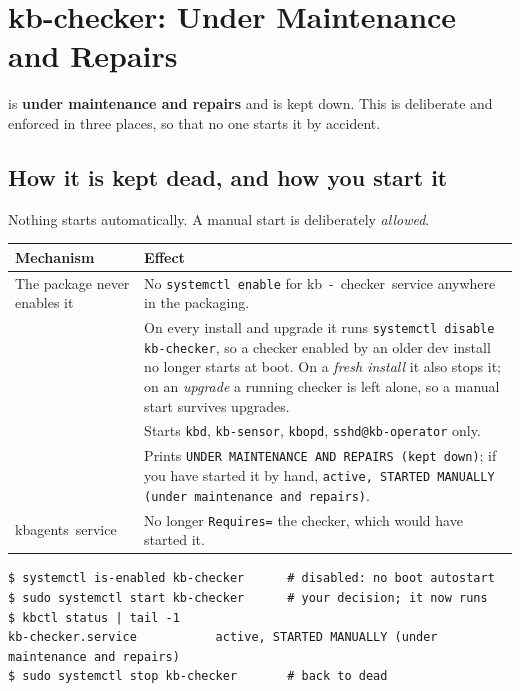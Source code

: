 \chapter{kb-checker: Under Maintenance and Repairs}
\label{ch:checker}
\begin{kbwarn}
 is \textbf{under maintenance and repairs} and is kept down. This is deliberate and
enforced in three places, so that no one starts it by accident.
\end{kbwarn}

\section{How it is kept dead, and how you start it}
Nothing starts  automatically. A manual start is deliberately \emph{allowed}.
\begin{center}\small
\begin{tabularx}{\textwidth}{@{}L{4.6cm}Y@{}}
\toprule
\textbf{Mechanism} & \textbf{Effect}\\
\midrule
The package never enables it & No \texttt{systemctl enable} for \unit{kb-checker.service} anywhere in the packaging.\\
 & On every install and upgrade it runs \texttt{systemctl disable kb-checker}, so a checker enabled by an older dev install no longer starts at boot. On a \emph{fresh install} it also stops it; on an \emph{upgrade} a running checker is left alone, so a manual start survives upgrades.\\
 & Starts \texttt{kbd}, \texttt{kb-sensor}, \texttt{kbopd}, \texttt{sshd@kb-operator} only.\\
 & Prints \texttt{UNDER MAINTENANCE AND REPAIRS (kept down)}; if you have started it by hand, \texttt{active, STARTED MANUALLY (under maintenance and repairs)}.\\
\unit{kbagents.service} & No longer \texttt{Requires=} the checker, which would have started it.\\
\bottomrule
\end{tabularx}
\end{center}
\begin{lstlisting}[style=console]
$ systemctl is-enabled kb-checker      # disabled: no boot autostart
$ sudo systemctl start kb-checker      # your decision; it now runs
$ kbctl status | tail -1
kb-checker.service           active, STARTED MANUALLY (under maintenance and repairs)
$ sudo systemctl stop kb-checker       # back to dead
\end{lstlisting}

